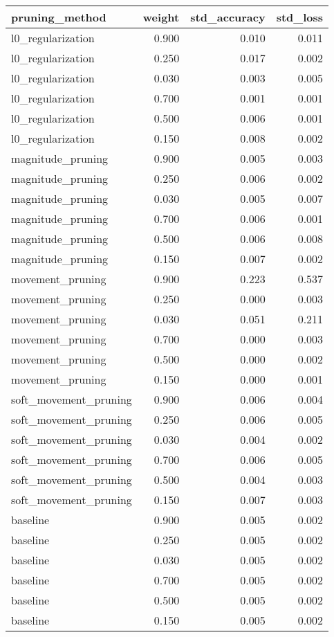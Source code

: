 \begin{tabular}{lrrr}
\toprule
       pruning\_method &  weight &  std\_accuracy &  std\_loss \\
\midrule
    l0\_regularization &   0.900 &         0.010 &     0.011 \\
    l0\_regularization &   0.250 &         0.017 &     0.002 \\
    l0\_regularization &   0.030 &         0.003 &     0.005 \\
    l0\_regularization &   0.700 &         0.001 &     0.001 \\
    l0\_regularization &   0.500 &         0.006 &     0.001 \\
    l0\_regularization &   0.150 &         0.008 &     0.002 \\
    magnitude\_pruning &   0.900 &         0.005 &     0.003 \\
    magnitude\_pruning &   0.250 &         0.006 &     0.002 \\
    magnitude\_pruning &   0.030 &         0.005 &     0.007 \\
    magnitude\_pruning &   0.700 &         0.006 &     0.001 \\
    magnitude\_pruning &   0.500 &         0.006 &     0.008 \\
    magnitude\_pruning &   0.150 &         0.007 &     0.002 \\
     movement\_pruning &   0.900 &         0.223 &     0.537 \\
     movement\_pruning &   0.250 &         0.000 &     0.003 \\
     movement\_pruning &   0.030 &         0.051 &     0.211 \\
     movement\_pruning &   0.700 &         0.000 &     0.003 \\
     movement\_pruning &   0.500 &         0.000 &     0.002 \\
     movement\_pruning &   0.150 &         0.000 &     0.001 \\
soft\_movement\_pruning &   0.900 &         0.006 &     0.004 \\
soft\_movement\_pruning &   0.250 &         0.006 &     0.005 \\
soft\_movement\_pruning &   0.030 &         0.004 &     0.002 \\
soft\_movement\_pruning &   0.700 &         0.006 &     0.005 \\
soft\_movement\_pruning &   0.500 &         0.004 &     0.003 \\
soft\_movement\_pruning &   0.150 &         0.007 &     0.003 \\
             baseline &   0.900 &         0.005 &     0.002 \\
             baseline &   0.250 &         0.005 &     0.002 \\
             baseline &   0.030 &         0.005 &     0.002 \\
             baseline &   0.700 &         0.005 &     0.002 \\
             baseline &   0.500 &         0.005 &     0.002 \\
             baseline &   0.150 &         0.005 &     0.002 \\
\bottomrule
\end{tabular}
